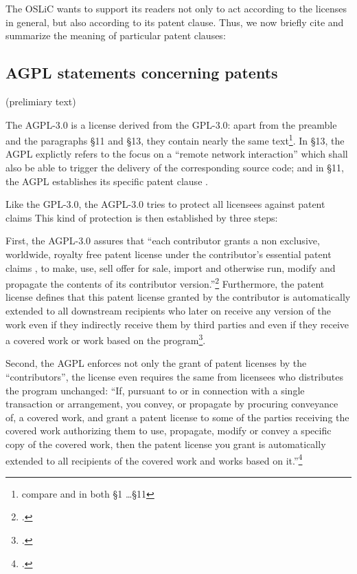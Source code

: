 The OSLiC wants to support its readers not only to act according to the licenses
in general, but also according to its patent clause. Thus, we now briefly cite
and summarize the meaning of particular patent clauses:

\subsection{AGPL statements concerning patents}\label{subsec:Agpl30PatentClause}

(prelimiary text)

The AGPL-3.0 is a license derived from the GPL-3.0: apart from the preamble and
the paragraphs §11 and §13, they contain nearly the same text\footnote{compare
\cite[][\nopage]{Agpl30OsiLicense2007a} and
\cite[][\nopage]{Gpl30OsiLicense2007a} in both §1 \ldots §11}.
In §13, the AGPL explictly refers to the focus on a \enquote{remote network
interaction} which shall also be able to trigger the delivery of the
corresponding source code; and in §11, the AGPL establishes its specific patent
clause \cite[cf.][\nopage §11 and §13]{Agpl30OsiLicense2007a}.

Like the GPL-3.0, the AGPL-3.0 tries to protect all licensees against patent
claims This kind of protection is then established by three steps:

First, the AGPL-3.0 assures that \enquote{each contributor grants a non
exclusive, worldwide, royalty free patent license under the contributor’s
essential patent claims , to make, use, sell offer for sale, import and
otherwise run, modify and propagate the contents of its contributor
version.}\footcite[cf.][\nopage §11]{Agpl30OsiLicense2007a} Furthermore, the
patent license defines that this patent license granted by the contributor is
automatically extended to all downstream recipients who later on receive any
version of the work even if they indirectly receive them by third parties and
even if they receive a covered work or work based on the
program\footcite[cf.][\nopage §11]{Agpl30OsiLicense2007a}.

Second, the AGPL enforces not only the grant of patent licenses by the
\enquote{contributors}, the license even requires the same from licensees who
distributes the program unchanged: \enquote{If, pursuant to or in connection
with a single transaction or arrangement, you convey, or propagate by procuring
conveyance of, a covered work, and grant a patent license to some of the parties
receiving the covered work authorizing them to use, propagate, modify or convey
a specific copy of the covered work, then the patent license you grant is
automatically extended to all recipients of the covered work and works based on
it.}\footcite[cf.][\nopage §11]{Agpl30OsiLicense2007a}

